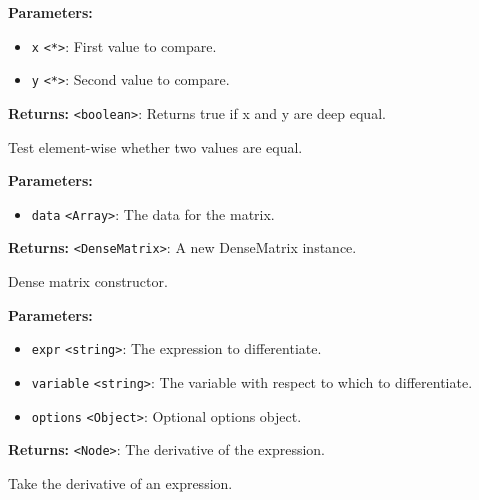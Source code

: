 \documentclass[12pt,a4paper]{article}
\begin{document}
\noindent \textbf{Parameters:}
\begin{itemize}
  \item \texttt{x} \texttt{<*>}: First value to compare.
  \item \texttt{y} \texttt{<*>}: Second value to compare.
\end{itemize}

\noindent \textbf{Returns:} \texttt{<boolean>}: Returns true if x and y are deep equal.

\noindent Test element-wise whether two values are equal.

\vspace{5mm}
\noindent {}


\noindent \textbf{Parameters:}
\begin{itemize}
  \item \texttt{data} \texttt{<Array>}: The data for the matrix.
\end{itemize}

\noindent \textbf{Returns:} \texttt{<DenseMatrix>}: A new DenseMatrix instance.

\noindent Dense matrix constructor.

\vspace{5mm}
\noindent {}


\noindent \textbf{Parameters:}
\begin{itemize}
  \item \texttt{expr} \texttt{<string>}: The expression to differentiate.
  \item \texttt{variable} \texttt{<string>}: The variable with respect to which to differentiate.
  \item \texttt{options} \texttt{<Object>}: Optional options object.
\end{itemize}

\noindent \textbf{Returns:} \texttt{<Node>}: The derivative of the expression.

\noindent Take the derivative of an expression.

\vspace{5mm}
\noindent {}\vspace{4mm}
\end{document}
